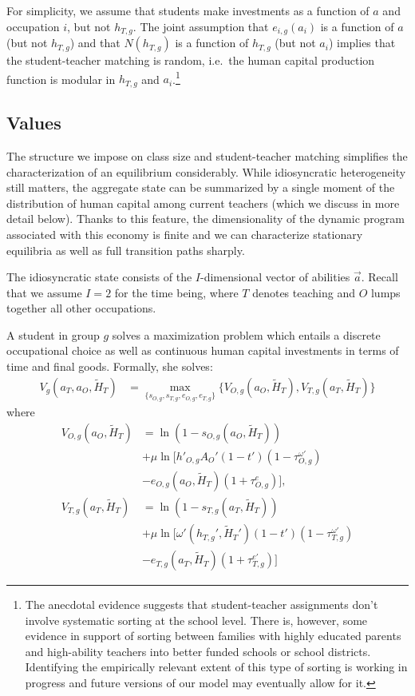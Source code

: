 \documentclass[onehalfspacing,11pt]{article}
\begin{document}
For simplicity, we assume that students make investments as a function of $a$ and occupation $i$, but not $h_{T,g}$. The joint assumption that $e_{i,g}(a_i)$ is a function of $a$ (but not $h_{T,g}$) and that $N(h_{T,g})$ is a function of $h_{T,g}$ (but not $a_i$) implies that the student-teacher matching is random, i.e.~the human capital production function is modular in $h_{T,g}$ and $a_i$.\footnote{The anecdotal evidence suggests that student-teacher assignments don't involve systematic sorting at the school level. There is, however, some evidence in support of sorting between families with highly educated parents and high-ability teachers into better funded schools or school districts. Identifying the empirically relevant extent of this type of sorting is working in progress and future versions of our model may eventually allow for it.}

\subsection{Values}
The structure we impose on class size and student-teacher matching simplifies the characterization of an equilibrium considerably. While idiosyncratic heterogeneity still matters, the aggregate state can be summarized by a single moment of the distribution of human capital among current teachers (which we discuss in more detail below). Thanks to this feature, the dimensionality of the dynamic program associated with this economy is finite and we can characterize stationary equilibria as well as full transition paths sharply.

The idiosyncratic state consists of the $I$-dimensional vector of abilities $\vec{a}$. Recall that we assume $I=2$ for the time being, where $T$ denotes teaching and $O$ lumps together all other occupations.

A student in group $g$ solves a maximization problem which entails a discrete occupational choice as well as continuous human capital investments in terms of time and final goods. Formally, she solves:
\begin{align}
\label{}
V_g(a_T,a_O,\widetilde{H}_T) & = \max_{\{s_{O,g},s_{T,g},e_{O,g},e_{T,g}\}} \bigg\{ V_{O,g}(a_O,\widetilde{H}_T), V_{T,g}(a_T,\widetilde{H}_T) \bigg\} \label{eq:V}
\end{align}
where
\begin{align}
V_{O,g}(a_O,\widetilde{H}_T) & = \ln\left(1-s_{O,g}\left(a_O,\widetilde{H}_T\right)\right) \nonumber \\
& + \mu \ln \Big[ {{h'}_{O,g}} A_O'(1-t')(1-\tau^{\omega '}_{O,g}) \nonumber \\
& - e_{O,g}(a_O,\widetilde{H}_T)(1+\tau^e_{O,g}) \Big], \label{eq:VO} \\
V_{T,g}(a_T,\widetilde{H}_T) & = \ln\left(1-s_{T,g}\left(a_T,\widetilde{H}_T\right)\right) \nonumber \\
& + \mu \ln \Big[ \omega'({h_{T,g}'},{\widetilde{H}_{T}'})(1-t')(1-\tau^{\omega '}_{T,g}) \nonumber \\
& - e_{T,g}(a_T,\widetilde{H}_T)(1+\tau^{e '}_{T,g}) \Big] \label{eq:VT}
\end{align}
\end{document}
